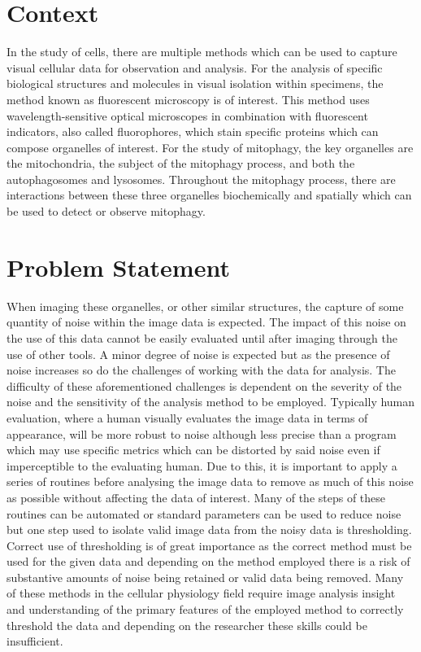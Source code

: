 
\section{Context}
In the study of cells, there are multiple methods which can be used to capture visual cellular data for observation and analysis. For the analysis of specific biological structures and molecules in visual isolation within specimens, the method known as fluorescent microscopy is of interest. This method uses wavelength-sensitive optical microscopes in combination with fluorescent indicators, also called fluorophores, which stain specific proteins which can compose organelles of interest.\citep{Sanderson-2014} For the study of mitophagy, the key organelles are the mitochondria, the subject of the mitophagy process, and both the autophagosomes and lysosomes. Throughout the mitophagy process, there are interactions between these three organelles biochemically and spatially which can be used to detect or observe mitophagy.
\section{Problem Statement}
When imaging these organelles, or other similar structures, the capture of some quantity of noise within the image data is expected. The impact of this noise on the use of this data cannot be easily evaluated until after imaging through the use of other tools. A minor degree of noise is expected but as the presence of noise increases so do the challenges of working with the data for analysis. The difficulty of these aforementioned challenges is dependent on the severity of the noise and the sensitivity of the analysis method to be employed. Typically human evaluation, where a human visually evaluates the image data in terms of appearance, will be more robust to noise although less precise than a program which may use specific metrics which can be distorted by said noise even if imperceptible to the evaluating human. Due to this, it is important to apply a series of routines before analysing the image data to remove as much of this noise as possible without affecting the data of interest. Many of the steps of these routines can be automated or standard parameters can be used to reduce noise but one step used to isolate valid image data from the noisy data is thresholding. Correct use of thresholding is of great importance as the correct method must be used for the given data and depending on the method employed there is a risk of substantive amounts of noise being retained or valid data being removed. Many of these methods in the cellular physiology field require image analysis insight and understanding of the primary features of the employed method to correctly threshold the data and depending on the researcher these skills could be insufficient. 
